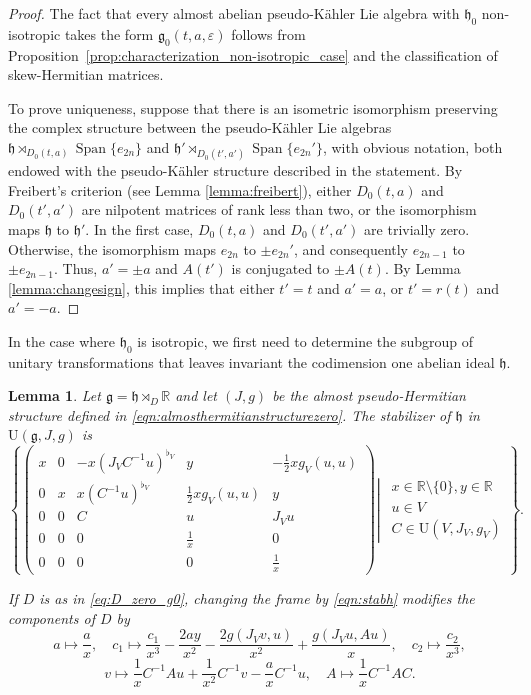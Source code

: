 \documentclass{article}
\newtheorem{lemma}[theorem]{Lemma}
\theoremstyle{definition}
\newcommand{\R}{\mathbb{R}}
\newcommand{\C}{\mathbb{C}}
\newcommand{\frh}{\mathfrak{h}}
\newcommand{\Span}[1]{\operatorname{Span}\{#1\}}
\newcommand{\lie}[1]{\mathfrak{#1}}
\newcommand{\g}{\lie g}
\newcommand{\h}{\lie h}
\begin{document}
\begin{proof}
    The fact that every almost abelian pseudo-Kähler Lie algebra with $\frh_0$ non-isotropic takes the form $\g_0(t,a,\varepsilon)$ follows from Proposition~\ref{prop:characterization_non-isotropic_case} and the classification of skew-Hermitian matrices.\medskip

    To prove uniqueness, suppose that there is an isometric isomorphism preserving the complex structure between the pseudo-Kähler Lie algebras $\h\rtimes_{D_0(t,a)}\Span{e_{2n}}$ and $\h'\rtimes_{D_0(t',a')}\Span{e_{2n}'}$, with obvious notation, both endowed with the pseudo-Kähler structure described in the statement. By Freibert's criterion (see Lemma \ref{lemma:freibert}), either $D_0(t,a)$ and $D_0(t',a')$ are nilpotent matrices of rank less than two, or the isomorphism maps $\h$ to $\h'$. In the first case, $D_0(t,a)$ and $D_0(t',a')$ are trivially zero. Otherwise, the isomorphism maps $e_{2n}$ to $\pm e_{2n}'$, and consequently $e_{2n-1}$ to $\pm e_{2n-1}$. Thus, $a'=\pm a$ and $A(t')$ is conjugated to $\pm A(t)$. By Lemma \ref{lemma:changesign}, this implies that either $t'=t$ and $a'=a$, or $t'=r(t)$ and $a'=-a$.
\end{proof}

In the case where $\frh_0$ is isotropic, we first need to determine the subgroup of unitary transformations that leaves invariant the codimension one abelian ideal $\frh$.

\begin{lemma}\label{lemma:orbitsarbitrarydimension}
    Let $\g=\frh\rtimes_D\R$ and let $(J,g)$ be the almost pseudo-Hermitian structure defined in \eqref{eqn:almosthermitianstructurezero}. The stabilizer of $\frh$ in $\mathrm{U}(\g,J,g)$ is \begin{equation}\label{eqn:stabh}
    \left\{\begin{pmatrix}
        x & 0 & -x(J_VC^{-1}u)^{\flat_V} & y & -\frac{1}{2}xg_V(u,u)\\
        0 &x & x(C^{-1}u)^{\flat_V} & \frac{1}{2}xg_V(u,u) & y\\
        0 & 0 & C & u & J_V u \\
        0 & 0 & 0 & \frac{1}{x} & 0 \\
        0 & 0 & 0 & 0 & \frac{1}{x}
        \end{pmatrix}\left|\ \ \begin{gathered}x\in\R\setminus\{0\}, y\in\R\\u\in V\\C\in\mathrm{U}(V,J_V,g_V)\end{gathered}\right.\right\}.
    \end{equation}
    
    If $D$ is as in \eqref{eq:D_zero_g0}, changing the frame by \eqref{eqn:stabh} modifies the components of $D$ by $$a\mapsto \frac{a}{x}, \quad c_1\mapsto \frac{c_1}{x^3} -\frac{2ay}{x^2} - \frac{2g(J_V v,u)}{x^2}+\frac{g(J_Vu, Au)}{x}, \quad c_2\mapsto \frac{c_2}{x^3},$$
    $$v\mapsto \frac1xC^{-1}Au+\frac1{x^2}C^{-1}v- \frac{a}{x} C^{-1}u , \quad A\mapsto \frac{1}{x}C^{-1}AC.$$
\end{lemma}
\end{document}
